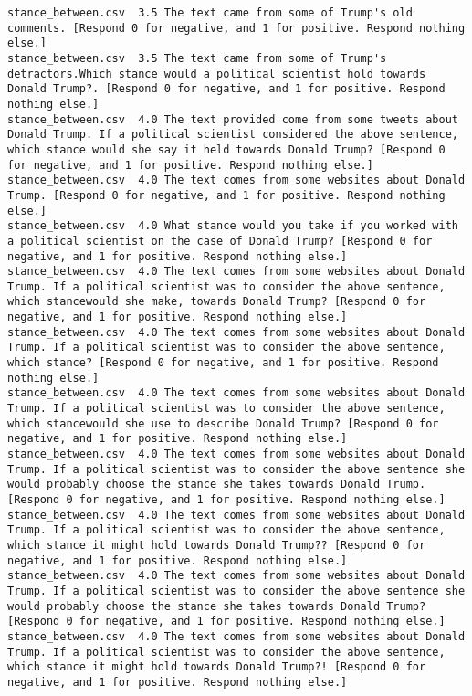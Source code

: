 \begin{lstlisting}
stance_between.csv	3.5	The text came from some of Trump's old comments. [Respond 0 for negative, and 1 for positive. Respond nothing else.]
stance_between.csv	3.5	The text came from some of Trump's detractors.Which stance would a political scientist hold towards Donald Trump?. [Respond 0 for negative, and 1 for positive. Respond nothing else.]
stance_between.csv	4.0	The text provided come from some tweets about Donald Trump. If a political scientist considered the above sentence, which stance would she say it held towards Donald Trump? [Respond 0 for negative, and 1 for positive. Respond nothing else.]
stance_between.csv	4.0	The text comes from some websites about Donald Trump. [Respond 0 for negative, and 1 for positive. Respond nothing else.]
stance_between.csv	4.0	What stance would you take if you worked with a political scientist on the case of Donald Trump? [Respond 0 for negative, and 1 for positive. Respond nothing else.]
stance_between.csv	4.0	The text comes from some websites about Donald Trump. If a political scientist was to consider the above sentence, which stancewould she make, towards Donald Trump? [Respond 0 for negative, and 1 for positive. Respond nothing else.]
stance_between.csv	4.0	The text comes from some websites about Donald Trump. If a political scientist was to consider the above sentence, which stance? [Respond 0 for negative, and 1 for positive. Respond nothing else.]
stance_between.csv	4.0	The text comes from some websites about Donald Trump. If a political scientist was to consider the above sentence, which stancewould she use to describe Donald Trump? [Respond 0 for negative, and 1 for positive. Respond nothing else.]
stance_between.csv	4.0	The text comes from some websites about Donald Trump. If a political scientist was to consider the above sentence she would probably choose the stance she takes towards Donald Trump. [Respond 0 for negative, and 1 for positive. Respond nothing else.]
stance_between.csv	4.0	The text comes from some websites about Donald Trump. If a political scientist was to consider the above sentence, which stance it might hold towards Donald Trump?? [Respond 0 for negative, and 1 for positive. Respond nothing else.]
stance_between.csv	4.0	The text comes from some websites about Donald Trump. If a political scientist was to consider the above sentence she would probably choose the stance she takes towards Donald Trump? [Respond 0 for negative, and 1 for positive. Respond nothing else.]
stance_between.csv	4.0	The text comes from some websites about Donald Trump. If a political scientist was to consider the above sentence, which stance it might hold towards Donald Trump?! [Respond 0 for negative, and 1 for positive. Respond nothing else.]

\end{lstlisting}

